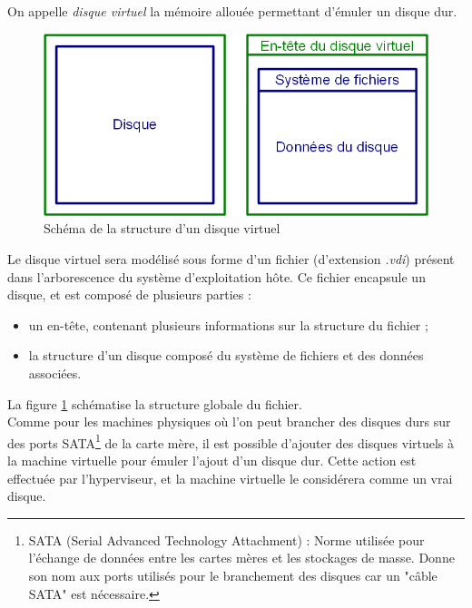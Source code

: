 On appelle \textit{disque virtuel} la mémoire allouée permettant d'émuler un disque dur.

\begin{figure}[!h]
	\center
	\includegraphics[scale=0.5]{images/Disque_virtuel.png}
	\caption{Schéma de la structure d'un disque virtuel}
	\label{Schéma Disque virtuel}
\end{figure}

Le disque virtuel sera modélisé sous forme d'un fichier (d'extension \textit{.vdi}) présent dans l'arborescence du système d'exploitation hôte.
Ce fichier encapsule un disque, et est composé de plusieurs parties :
\begin{itemize}
	\item un en-tête, contenant plusieurs informations sur la structure du fichier ;
	\item la structure d'un disque composé du système de fichiers et des données associées.
\end{itemize}
La figure \ref{Schéma Disque virtuel} schématise la structure globale du fichier.
\\


Comme pour les machines physiques où l'on peut brancher des disques durs sur des ports SATA\footnote{SATA (Serial Advanced Technology Attachment) : Norme utilisée pour l'échange de données entre les cartes mères et les stockages de masse. Donne son nom aux ports utilisés pour le branchement des disques car un "câble SATA" est nécessaire.} de la carte mère, il est possible d'ajouter des disques virtuels à la machine virtuelle pour émuler l'ajout d'un disque dur.
Cette action est effectuée par l'hyperviseur, et la machine virtuelle le considérera comme un vrai disque.
\\





